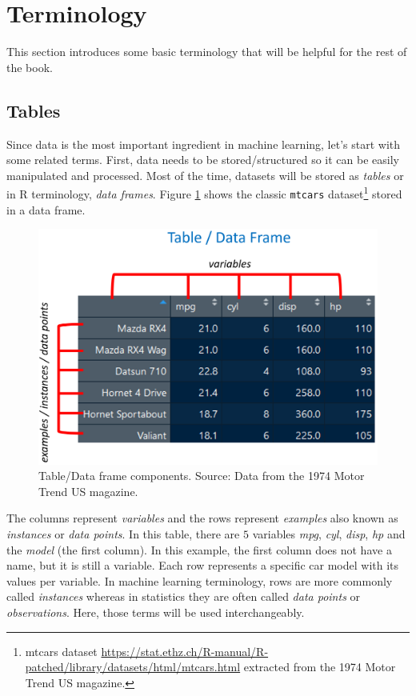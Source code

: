 \documentclass[
  11pt,
]{krantz}
\begin{document}
\hypertarget{terminology}{%
\section{Terminology}\label{terminology}}

This section introduces some basic terminology that will be helpful for the rest of the book.

\hypertarget{tables}{%
\subsection{Tables}\label{tables}}

Since data is the most important ingredient in machine learning, let's start with some related terms. First, data needs to be stored/structured so it can be easily manipulated and processed. Most of the time, datasets will be stored as \emph{tables} or in R terminology, \emph{data frames}. Figure \ref{fig:terminology1} shows the classic \texttt{mtcars} dataset\footnote{mtcars dataset \url{https://stat.ethz.ch/R-manual/R-patched/library/datasets/html/mtcars.html} extracted from the 1974 Motor Trend US magazine.} stored in a data frame.



\begin{figure}

{\centering \includegraphics[width=0.9\linewidth]{images/terminologyTable} 

}

\caption{Table/Data frame components. Source: Data from the 1974 Motor Trend US magazine.}\label{fig:terminology1}
\end{figure}

The columns represent \emph{variables} and the rows represent \emph{examples} also known as \emph{instances} or \emph{data points}. In this table, there are \(5\) variables \emph{mpg}, \emph{cyl}, \emph{disp}, \emph{hp} and the \emph{model} (the first column). In this example, the first column does not have a name, but it is still a variable. Each row represents a specific car model with its values per variable. In machine learning terminology, rows are more commonly called \emph{instances} whereas in statistics they are often called \emph{data points} or \emph{observations}. Here, those terms will be used interchangeably.
\end{document}
